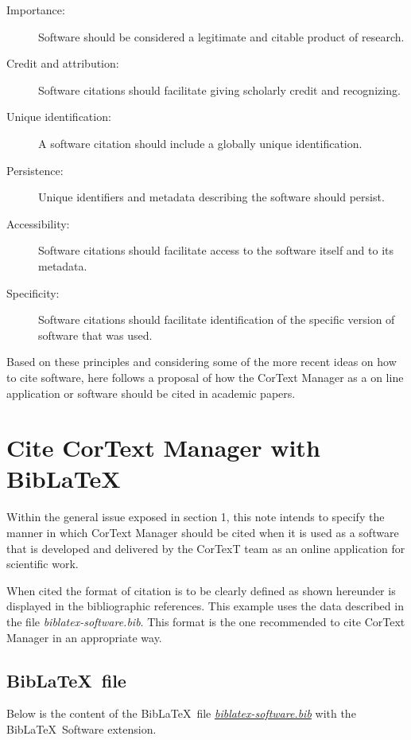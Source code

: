 \documentclass{article}
\begin{document}
\begin{description}
  \item[Importance:] Software should be considered a legitimate and citable product of research.
  \item[Credit and attribution:] Software citations should facilitate giving scholarly credit and recognizing.
  \item[Unique identification:] A software citation should include a globally unique identification.
  \item[Persistence:] Unique identifiers and metadata describing the software should persist.
  \item[Accessibility:] Software citations should facilitate access to the software itself and to its metadata.
  \item[Specificity:] Software citations should facilitate identification of the specific version of software that was used.
\end{description}

Based on these principles and considering some of the more recent ideas on how
to cite software, here follows a proposal of how the CorText Manager as a on
line application or software should be cited in academic papers.

\section{Cite CorText Manager with Bib\LaTeX} \label{example-biblatex}

Within the general issue exposed in section 1, this note intends to specify the
manner in which CorText Manager should be cited when it is used as a software
that is developed and delivered by the CorTexT team as an online application
for scientific work.

When cited the format of citation is to be clearly defined as shown hereunder
\cite{cortext_manager_v2} is displayed in the bibliographic references. This
example uses the data described in the file {\em biblatex-software.bib}.  This
format is the one recommended to cite CorText Manager in an appropriate way.

\printbibliography[type=software,title={\small References to Software (example)}]

\subsection{Bib\LaTeX \ file}

Below is the content of the Bib\LaTeX \ file
\href{https://github.com/cortext/how-to-cite-cortext/blob/main/biblatex-software.bib}{\em biblatex-software.bib}
with the Bib\LaTeX \ Software extension\cite{softwareheritageorg_citing_2020}.
\end{document}
